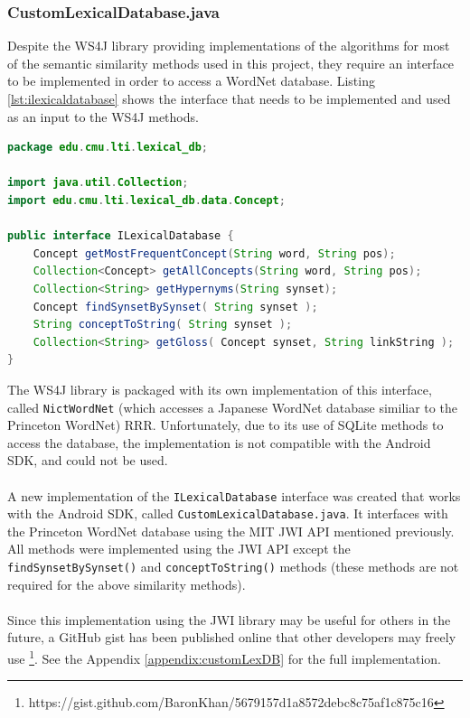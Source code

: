 \documentclass[12pt]{article}
\begin{document}
\subsubsection{CustomLexicalDatabase.java}

Despite the WS4J library providing implementations of the algorithms for most of the semantic similarity methods used in this project, they require an interface to be implemented in order to access a WordNet database. Listing \ref{lst:ilexicaldatabase} shows the interface that needs to be implemented and used as an input to the WS4J methods.

\begin{lstlisting}[language=Java, caption=ILexicalDatabase.java (from the WS4J library), label={lst:ilexicaldatabase}]
package edu.cmu.lti.lexical_db;

import java.util.Collection;
import edu.cmu.lti.lexical_db.data.Concept;

public interface ILexicalDatabase {
	Concept getMostFrequentConcept(String word, String pos);
	Collection<Concept> getAllConcepts(String word, String pos);
	Collection<String> getHypernyms(String synset);
	Concept findSynsetBySynset( String synset );
	String conceptToString( String synset );
	Collection<String> getGloss( Concept synset, String linkString );
}
\end{lstlisting}

The WS4J library is packaged with its own implementation of this interface, called \texttt{NictWordNet} (which accesses a Japanese WordNet database similiar to the Princeton WordNet) RRR. Unfortunately, due to its use of SQLite methods to access the database, the implementation is not compatible with the Android SDK, and could not be used.
\\
\\
A new implementation of the \texttt{ILexicalDatabase} interface was created that works with the Android SDK, called \texttt{CustomLexicalDatabase.java}. It interfaces with the Princeton WordNet database using the MIT JWI API mentioned previously. All methods were implemented using the JWI API except the \texttt{findSynsetBySynset()} and \texttt{conceptToString()} methods (these methods are not required for the above similarity methods).
\\
\\
Since this implementation using the JWI library may be useful for others in the future, a GitHub gist has been published online that other developers may freely use \footnote{https://gist.github.com/BaronKhan/5679157d1a8572debc8c75af1c875c16}. See the Appendix \ref{appendix:customLexDB} for the full implementation.
\end{document}

